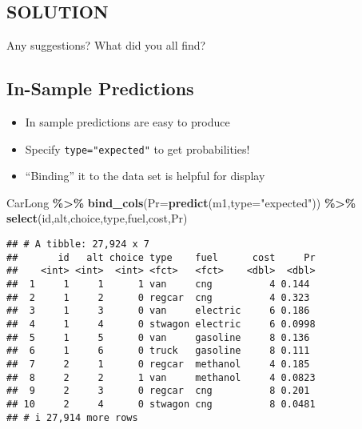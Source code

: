\documentclass[
  11pt,
]{article}
\newenvironment{Shaded}{\begin{snugshade}}{\end{snugshade}}
\newcommand{\AttributeTok}[1]{\textcolor[rgb]{0.13,0.29,0.53}{#1}}
\newcommand{\FunctionTok}[1]{\textcolor[rgb]{0.13,0.29,0.53}{\textbf{#1}}}
\newcommand{\NormalTok}[1]{#1}
\newcommand{\SpecialCharTok}[1]{\textcolor[rgb]{0.81,0.36,0.00}{\textbf{#1}}}
\newcommand{\StringTok}[1]{\textcolor[rgb]{0.31,0.60,0.02}{#1}}
\providecommand{\tightlist}{%
  \setlength{\itemsep}{0pt}\setlength{\parskip}{0pt}}
\begin{document}
\hypertarget{solution}{%
\subsection{SOLUTION}\label{solution}}

Any suggestions? What did you all find?

\hypertarget{in-sample-predictions}{%
\subsection{In-Sample Predictions}\label{in-sample-predictions}}

\begin{itemize}
\tightlist
\item
  In sample predictions are easy to produce
\item
  Specify \texttt{type="expected"} to get probabilities!
\item
  ``Binding'' it to the data set is helpful for display
\end{itemize}

\footnotesize

\begin{Shaded}
\begin{Highlighting}[]
\NormalTok{CarLong }\SpecialCharTok{\%\textgreater{}\%} \FunctionTok{bind\_cols}\NormalTok{(}\AttributeTok{Pr=}\FunctionTok{predict}\NormalTok{(m1,}\AttributeTok{type=}\StringTok{"expected"}\NormalTok{)) }\SpecialCharTok{\%\textgreater{}\%} 
  \FunctionTok{select}\NormalTok{(id,alt,choice,type,fuel,cost,Pr)}
\end{Highlighting}
\end{Shaded}

\begin{verbatim}
## # A tibble: 27,924 x 7
##       id   alt choice type    fuel      cost     Pr
##    <int> <int>  <int> <fct>   <fct>    <dbl>  <dbl>
##  1     1     1      1 van     cng          4 0.144 
##  2     1     2      0 regcar  cng          4 0.323 
##  3     1     3      0 van     electric     6 0.186 
##  4     1     4      0 stwagon electric     6 0.0998
##  5     1     5      0 van     gasoline     8 0.136 
##  6     1     6      0 truck   gasoline     8 0.111 
##  7     2     1      0 regcar  methanol     4 0.185 
##  8     2     2      1 van     methanol     4 0.0823
##  9     2     3      0 regcar  cng          8 0.201 
## 10     2     4      0 stwagon cng          8 0.0481
## # i 27,914 more rows
\end{verbatim}
\end{document}
